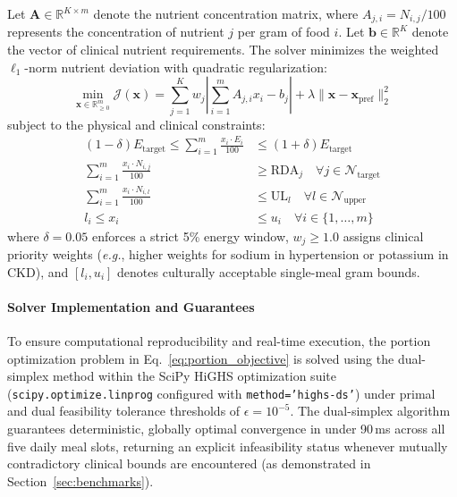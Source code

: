 \documentclass[5p,times,twocolumn]{elsarticle}
\newcommand{\eg}{\textit{e.g.}}
\begin{document}
Let $\mathbf{A} \in \mathbb{R}^{K \times m}$ denote the nutrient concentration matrix, where $A_{j,i} = N_{i,j} / 100$ represents the concentration of nutrient $j$ per gram of food $i$. Let $\mathbf{b} \in \mathbb{R}^K$ denote the vector of clinical nutrient requirements. The solver minimizes the weighted $\ell_1$-norm nutrient deviation with quadratic regularization:
\begin{equation}
\min_{\mathbf{x} \in \mathbb{R}_{\ge 0}^m} \mathcal{J}(\mathbf{x}) = \sum_{j=1}^K w_j \left| \sum_{i=1}^m A_{j,i} x_i - b_j \right| + \lambda \|\mathbf{x} - \mathbf{x}_{\text{pref}}\|_2^2
\label{eq:portion_objective}
\end{equation}
subject to the physical and clinical constraints:
\begin{align}
(1 - \delta) E_{\text{target}} \le \sum_{i=1}^m \frac{x_i \cdot E_i}{100} &\le (1 + \delta) E_{\text{target}} \label{eq:energy_bound} \\
\sum_{i=1}^m \frac{x_i \cdot N_{i,j}}{100} &\ge \text{RDA}_j \quad \forall j \in \mathcal{N}_{\text{target}} \label{eq:nutrient_target} \\
\sum_{i=1}^m \frac{x_i \cdot N_{i,l}}{100} &\le \text{UL}_l \quad \forall l \in \mathcal{N}_{\text{upper}} \label{eq:ul_target} \\
l_i \le x_i &\le u_i \quad \forall i \in \{1, \ldots, m\} \label{eq:portion_bound}
\end{align}
where $\delta = 0.05$ enforces a strict 5\% energy window, $w_j \ge 1.0$ assigns clinical priority weights (\eg{}, higher weights for sodium in hypertension or potassium in CKD), and $[l_i, u_i]$ denotes culturally acceptable single-meal gram bounds.

\paragraph{Solver Implementation and Guarantees}
To ensure computational reproducibility and real-time execution, the portion optimization problem in Eq.~\eqref{eq:portion_objective} is solved using the dual-simplex method within the SciPy HiGHS optimization suite (\texttt{scipy.optimize.linprog} configured with \texttt{method='highs-ds'}) under primal and dual feasibility tolerance thresholds of $\epsilon = 10^{-5}$. The dual-simplex algorithm guarantees deterministic, globally optimal convergence in under 90\,ms across all five daily meal slots, returning an explicit infeasibility status whenever mutually contradictory clinical bounds are encountered (as demonstrated in Section~\ref{sec:benchmarks}).
\end{document}
